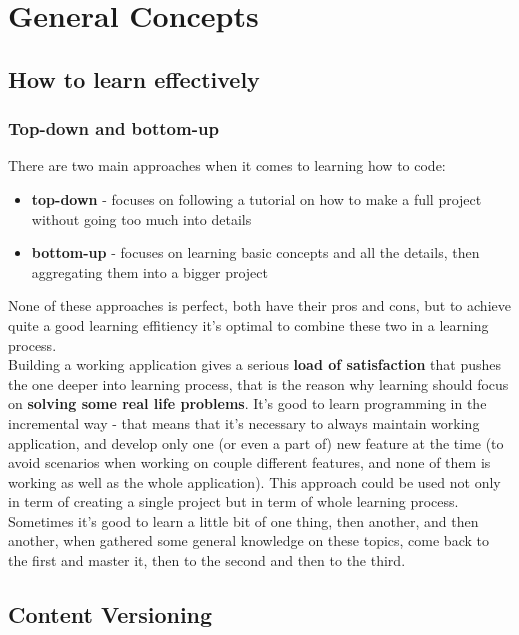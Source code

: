 \part{General Concepts}

\chapter{How to learn effectively}

\section{Top-down and bottom-up}

There are two main approaches when it comes to learning how to code:
\begin{itemize}
\item \textbf{top-down} - focuses on following a tutorial on how to make a full project without going too much into details 
\item \textbf{bottom-up} - focuses on learning basic concepts and all the details, then aggregating them into a bigger project
\end{itemize}
None of these approaches is perfect, both have their pros and cons, but to achieve quite a good learning effitiency it's optimal to combine these two in a learning process.\\

Building a working application gives a serious \textbf{load of satisfaction} that pushes the one deeper into learning process, that is the reason why learning should focus on \textbf{solving some real life problems}. It's good to learn programming in the incremental way - that means that it's necessary to always maintain working application, and develop only one (or even a part of) new feature at the time (to avoid scenarios when working on couple different features, and none of them is working as well as the whole application). This approach could be used not only in term of creating a single project but in term of whole learning process. Sometimes it's good to learn a little bit of one thing, then another, and then another, when gathered some general knowledge on these topics, come back to the first and master it, then to the second and then to the third.

\chapter{Content Versioning}

